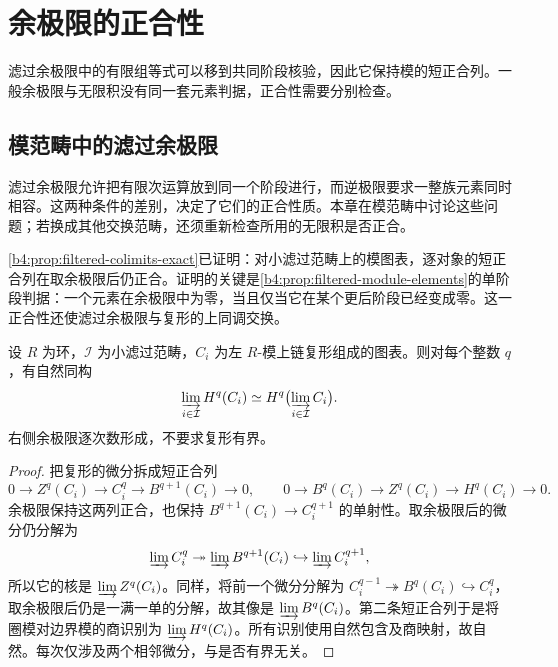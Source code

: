 
\section{余极限的正合性}
\label{b4:sec:1301}

滤过余极限中的有限组等式可以移到共同阶段核验，因此它保持模的短正合列。一般余极限与无限积没有同一套元素判据，正合性需要分别检查。

%
%

\subsection{模范畴中的滤过余极限}
\label{b4:subsec:1301:01}

滤过余极限允许把有限次运算放到同一个阶段进行，而逆极限要求一整族元素同时相容。这两种条件的差别，决定了它们的正合性质。本章在模范畴中讨论这些问题；若换成其他交换范畴，还须重新检查所用的无限积是否正合。

\ProseParagraphBreak
\cref{b4:prop:filtered-colimits-exact}已证明：对小滤过范畴上的模图表，逐对象的短正合列在取余极限后仍正合。证明的关键是\cref{b4:prop:filtered-module-elements}的单阶段判据：一个元素在余极限中为零，当且仅当它在某个更后阶段已经变成零。这一正合性还使滤过余极限与复形的上同调交换。

\begin{proposition}\label{b4:prop:filtered-colimits-cohomology}
	设 \(R\) 为环，\(\mathcal I\) 为小滤过范畴，\(C_i\) 为左 \(R\)-模上链复形组成的图表。则对每个整数 \(q\)，有自然同构
	\[
		\varinjlim_{i\in\mathcal I}H^q(C_i) \simeq H^q\bigl(\varinjlim_{i\in\mathcal I}C_i\bigr).
	\]
	右侧余极限逐次数形成，不要求复形有界。
\end{proposition}
\begin{proof}
	把复形的微分拆成短正合列
	\[
		0\to Z^q(C_i)\to C_i^q\to B^{q+1}(C_i)\to0,\qquad 0\to B^q(C_i)\to Z^q(C_i)\to H^q(C_i)\to0.
	\]
	余极限保持这两列正合，也保持 \(B^{q+1}(C_i)\to C_i^{q+1}\) 的单射性。取余极限后的微分仍分解为
	\[
		\varinjlim C_i^q\twoheadrightarrow\varinjlim B^{q+1}(C_i) \hookrightarrow\varinjlim C_i^{q+1},
	\]
	所以它的核是 \(\varinjlim Z^q(C_i)\)。同样，将前一个微分分解为 \(C_i^{q-1}\twoheadrightarrow B^q(C_i)\hookrightarrow C_i^q\)，取余极限后仍是一满一单的分解，故其像是 \(\varinjlim B^q(C_i)\)。第二条短正合列于是将圈模对边界模的商识别为 \(\varinjlim H^q(C_i)\)。所有识别使用自然包含及商映射，故自然。每次仅涉及两个相邻微分，与是否有界无关。
\end{proof}

